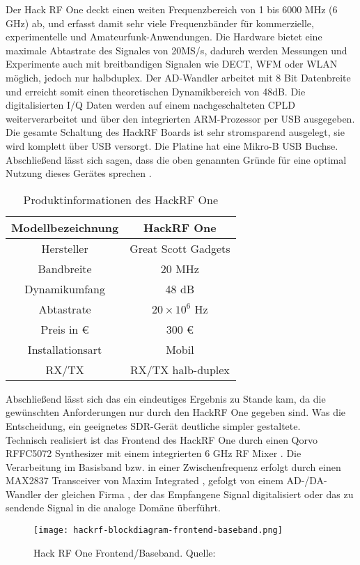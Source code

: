 Der Hack RF One deckt einen weiten Frequenzbereich von 1 bis 6000 MHz (6 GHz) ab, und erfasst damit sehr viele Frequenzbänder für kommerzielle, experimentelle und Amateurfunk-Anwendungen. Die Hardware bietet eine maximale Abtastrate des Signales von 20MS/s, dadurch werden Messungen und Experimente auch mit breitbandigen Signalen wie DECT, WFM oder WLAN möglich, jedoch nur halbduplex. Der AD-Wandler arbeitet mit 8 Bit Datenbreite und erreicht somit einen theoretischen Dynamikbereich von 48dB. Die digitalisierten I/Q Daten werden auf einem nachgeschalteten CPLD weiterverarbeitet und über den integrierten ARM-Prozessor per USB ausgegeben. Die gesamte Schaltung des HackRF Boards ist sehr stromsparend ausgelegt, sie wird komplett über USB versorgt. Die Platine hat eine Mikro-B USB Buchse. Abschließend lässt sich sagen, dass die oben genannten Gründe für eine optimal Nutzung dieses Gerätes sprechen \cite{wimo:2018}.\\

\begin{table}[ht]
	\centering
	\begin{tabular}{c|c}
		Modellbezeichnung & HackRF One  \\
		\hline
		Hersteller & Great Scott Gadgets\\ 
		\hline 
		Bandbreite & 20 MHz \\ 
		\hline 
		Dynamikumfang & 48 dB \\ %
		\hline 
		Abtastrate & \( 20 \times 10^{6} \) Hz \\ 
		\hline 
		Preis in \euro &  300 \euro\\ 
		\hline 
		Installationsart & Mobil \\ 
		\hline 
		RX/TX & RX/TX halb-duplex \\ 
	\end{tabular} 
	\caption{Produktinformationen des HackRF One}
\end{table}

Abschließend lässt sich das ein eindeutiges Ergebnis zu Stande kam, da die gewünschten Anforderungen nur durch den HackRF One gegeben sind. Was die Entscheidung, ein geeignetes SDR-Gerät deutliche simpler gestaltete.\\

Technisch realisiert ist das Frontend des HackRF One durch einen Qorvo RFFC5072 Synthesizer mit einem integrierten 6 GHz RF Mixer \cite{qorvo}.
Die Verarbeitung im Basisband bzw. in einer Zwischenfrequenz erfolgt durch einen MAX2837 Transceiver von Maxim Integrated \cite{max2837}, gefolgt von einem AD-/DA- Wandler der gleichen Firma \cite{max5864}, der das Empfangene Signal digitalisiert oder das zu sendende Signal in die analoge Domäne überführt.
\begin{figure}[ht]
	\centering
	\texttt{[image: hackrf-blockdiagram-frontend-baseband.png]}
	\caption[Hack RF One Frontend/Baseband]{Hack RF One Frontend/Baseband. Quelle: \cite{hackrf-wiki:2016}} 
	\label{HackRFOne-Blockschaltbild}
\end{figure}
